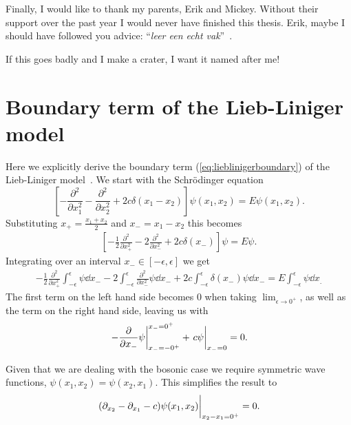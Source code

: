 \documentclass[11pt, a4paper]{report} %
\begin{document}
Finally, I would like to thank my parents, Erik and Mickey.
Without their support over the past year I would never have finished this thesis.
Erik, maybe I should have followed you advice: ``\textit{leer een echt vak}''~\cite{erik}.

\appendix

\begin{savequote}[50mm]
If this goes badly and I make a crater, I want it named after me!
\end{savequote}

\chapter{Boundary term of the Lieb-Liniger model}\label{cha:boundary}

Here we explicitly derive the boundary term (\cref{eq:lieblinigerboundary}) of the Lieb-Liniger model~\cite{Caux2015}.
We start with the Schrödinger equation
\begin{equation}
	\left[- \frac{\partial^2}{\partial x_1^2} - \frac{\partial^2}{\partial x_2^2} + 2c \delta(x_1 - x_2)\right] \psi(x_1, x_2) = E \psi(x_1,x_2).
\end{equation} 
Substituting \(x_+ = \frac{x_1+x_2}{2}\) and \(x_-=x_1-x_2\) this becomes
\begin{align}
  \label{eq:17}
  	\left[-\frac{1}{2}\frac{\partial^2}{\partial x_+^2} - 2\frac{\partial^2}{\partial x_-^2} + 2c \delta(x_-)\right] \psi = E\psi.
\end{align}
Integrating over an interval \(x_-\in[-\epsilon,\epsilon]\) we get
\begin{align}
  \label{eq:18}
  -\frac{1}{2} \frac{\partial^2}{\partial x_+^2} \int_{-\epsilon}^{\epsilon} \psi \dd x_- - 2 \int_{-\epsilon}^{\epsilon} \frac{\partial^2}{\partial x_-^2}\psi \dd x_- + 2c\int_{-\epsilon}^{\epsilon} \delta(x_-)\psi \dd x_- = E\int_{-\epsilon}^{\epsilon} \psi \dd x_.
\end{align}
The first term on the left hand side becomes 0 when taking \(\lim_{\epsilon\to0^+}\), as well as the term on the right hand side, leaving us with
\begin{align}
  \label{eq:19}
  \eval{- \frac{\partial}{\partial x_-} \psi }_{x_-=-0^+}^{x_-=0^+}  + \eval{c\psi}_{x_-=0} = 0.
\end{align}

Given that we are dealing with the bosonic case we require symmetric wave functions, \(\psi(x_1,x_2)=\psi(x_2,x_1)\).
This simplifies the result to
\begin{align}
  \label{eq:20}
  \eval{\qty(\partial_{x_2} - \partial_{x_1} - c) \psi(x_1, x_2)}_{x_2-x_1=0^+} = 0.
\end{align}
\end{document}
